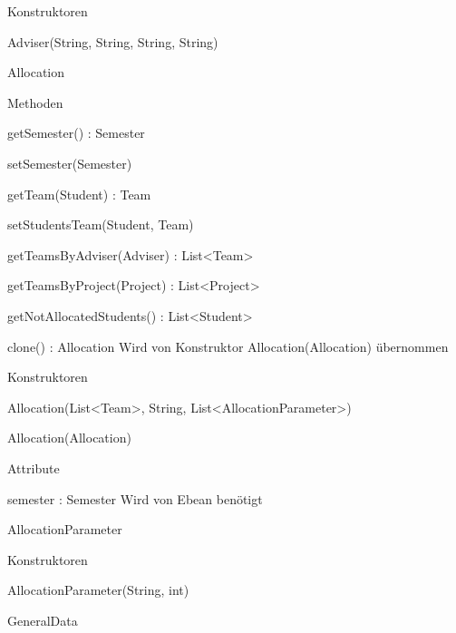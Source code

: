 \documentclass[parskip=full]{scrartcl}
\newcommand{\changeDescription}[1]{{\newline\color{black}\normalfont #1}}
\newcommand{\code}[1]{{\ttfamily #1}}
\begin{document}
\begin{itemPackage}
\begin{itemClass}
\begin{itemClassSub}
\item Konstruktoren
\begin{itemPlus}
\item Adviser(String, String, String, String)
\end{itemPlus}
\end{itemClassSub}
\item Allocation
\item \begin{itemClassSub}
\item Methoden
\begin{itemPlus}
\item getSemester() : Semester
\item setSemester(Semester)
\item getTeam(Student) : Team
\item setStudentsTeam(Student, Team)
\item getTeamsByAdviser(Adviser) : List<Team>
\item getTeamsByProject(Project) : List<Project>
\item getNotAllocatedStudents() : List<Student>
\end{itemPlus}
\begin{itemMinus}
\item clone() : Allocation \changeDescription{Wird von Konstruktor
\code{Allocation(Allocation)} übernommen}
\end{itemMinus}
\item Konstruktoren
\begin{itemPlus}
\item Allocation(List<Team>, String, List<AllocationParameter>)
\item Allocation(Allocation)
\end{itemPlus}
\item Attribute
\begin{itemPlus}
\item semester : Semester \changeDescription{Wird von Ebean benötigt}
\end{itemPlus}
\end{itemClassSub}
\item AllocationParameter
\begin{itemClassSub}
\item Konstruktoren
\begin{itemPlus}
\item AllocationParameter(String, int)
\end{itemPlus}
\end{itemClassSub}
\item GeneralData

\end{itemClass}
\end{itemPackage}
\end{document}
